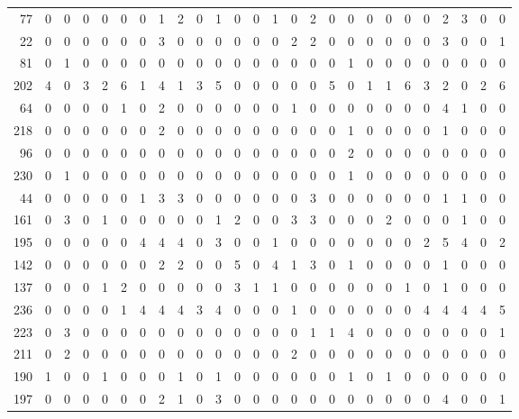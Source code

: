 \begin{longtable}{@{\extracolsep{\fill}}rccccccccccccccccccccccccc@{}}
77 & 0 & 0 & 0 & 0 & 0 & 0 & 1 & 2 & 0 & 1 & 0 & 0 & 1 & 0 & 2 & 0 & 0 & 0 & 0 & 0 & 0 & 2 & 3 & 0 & 0 \\
22 & 0 & 0 & 0 & 0 & 0 & 0 & 3 & 0 & 0 & 0 & 0 & 0 & 0 & 2 & 2 & 0 & 0 & 0 & 0 & 0 & 0 & 3 & 0 & 0 & 1 \\
81 & 0 & 1 & 0 & 0 & 0 & 0 & 0 & 0 & 0 & 0 & 0 & 0 & 0 & 0 & 0 & 0 & 1 & 0 & 0 & 0 & 0 & 0 & 0 & 0 & 0 \\
202 & 4 & 0 & 3 & 2 & 6 & 1 & 4 & 1 & 3 & 5 & 0 & 0 & 0 & 0 & 0 & 5 & 0 & 1 & 1 & 6 & 3 & 2 & 0 & 2 & 6 \\
64 & 0 & 0 & 0 & 0 & 1 & 0 & 2 & 0 & 0 & 0 & 0 & 0 & 0 & 1 & 0 & 0 & 0 & 0 & 0 & 0 & 0 & 4 & 1 & 0 & 0 \\
218 & 0 & 0 & 0 & 0 & 0 & 0 & 2 & 0 & 0 & 0 & 0 & 0 & 0 & 0 & 0 & 0 & 1 & 0 & 0 & 0 & 0 & 1 & 0 & 0 & 0 \\
96 & 0 & 0 & 0 & 0 & 0 & 0 & 0 & 0 & 0 & 0 & 0 & 0 & 0 & 0 & 0 & 0 & 2 & 0 & 0 & 0 & 0 & 0 & 0 & 0 & 0 \\
230 & 0 & 1 & 0 & 0 & 0 & 0 & 0 & 0 & 0 & 0 & 0 & 0 & 0 & 0 & 0 & 0 & 1 & 0 & 0 & 0 & 0 & 0 & 0 & 0 & 0 \\
44 & 0 & 0 & 0 & 0 & 0 & 1 & 3 & 3 & 0 & 0 & 0 & 0 & 0 & 0 & 3 & 0 & 0 & 0 & 0 & 0 & 0 & 1 & 1 & 0 & 0 \\
161 & 0 & 3 & 0 & 1 & 0 & 0 & 0 & 0 & 0 & 1 & 2 & 0 & 0 & 3 & 3 & 0 & 0 & 0 & 2 & 0 & 0 & 0 & 1 & 0 & 0 \\
195 & 0 & 0 & 0 & 0 & 0 & 4 & 4 & 4 & 0 & 3 & 0 & 0 & 1 & 0 & 0 & 0 & 0 & 0 & 0 & 0 & 2 & 5 & 4 & 0 & 2 \\
142 & 0 & 0 & 0 & 0 & 0 & 0 & 2 & 2 & 0 & 0 & 5 & 0 & 4 & 1 & 3 & 0 & 1 & 0 & 0 & 0 & 0 & 1 & 0 & 0 & 0 \\
137 & 0 & 0 & 0 & 1 & 2 & 0 & 0 & 0 & 0 & 0 & 3 & 1 & 1 & 0 & 0 & 0 & 0 & 0 & 0 & 1 & 0 & 1 & 0 & 0 & 0 \\
236 & 0 & 0 & 0 & 0 & 1 & 4 & 4 & 4 & 3 & 4 & 0 & 0 & 0 & 1 & 0 & 0 & 0 & 0 & 0 & 0 & 4 & 4 & 4 & 4 & 5 \\
223 & 0 & 3 & 0 & 0 & 0 & 0 & 0 & 0 & 0 & 0 & 0 & 0 & 0 & 0 & 1 & 1 & 4 & 0 & 0 & 0 & 0 & 0 & 0 & 0 & 1 \\
211 & 0 & 2 & 0 & 0 & 0 & 0 & 0 & 0 & 0 & 0 & 0 & 0 & 0 & 2 & 0 & 0 & 0 & 0 & 0 & 0 & 0 & 0 & 0 & 0 & 0 \\
190 & 1 & 0 & 0 & 1 & 0 & 0 & 0 & 1 & 0 & 1 & 0 & 0 & 0 & 0 & 0 & 0 & 1 & 0 & 1 & 0 & 0 & 0 & 0 & 0 & 0 \\
197 & 0 & 0 & 0 & 0 & 0 & 0 & 2 & 1 & 0 & 3 & 0 & 0 & 0 & 0 & 0 & 0 & 0 & 0 & 0 & 0 & 0 & 4 & 0 & 0 & 1 \\

\end{longtable}
